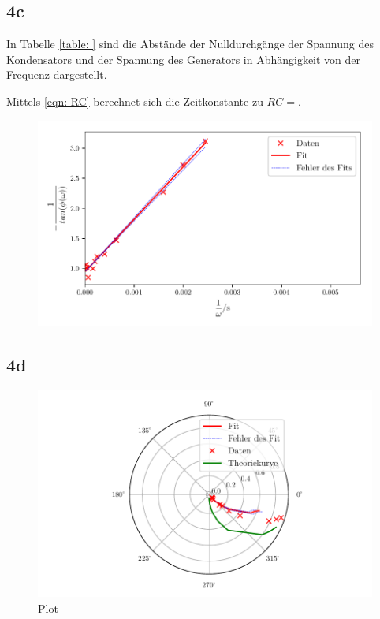 \subsection{4c}
In Tabelle \ref{table: } sind die Abstände der Nulldurchgänge der Spannung des Kondensators und der Spannung %
des Generators in Abhängigkeit von der Frequenz dargestellt.


Mittels \eqref{eqn: RC} berechnet sich die Zeitkonstante zu $RC = $. %

\begin{figure}
  \centering
  \includegraphics{build/plotc.pdf}
  \caption{}
  \label{fig:plotc}
\end{figure}

\subsection{4d}



\begin{figure}
  \centering
  \includegraphics{build/plotd1.pdf}
  \caption{Plot}
  \label{fig:plotd1}
\end{figure}

